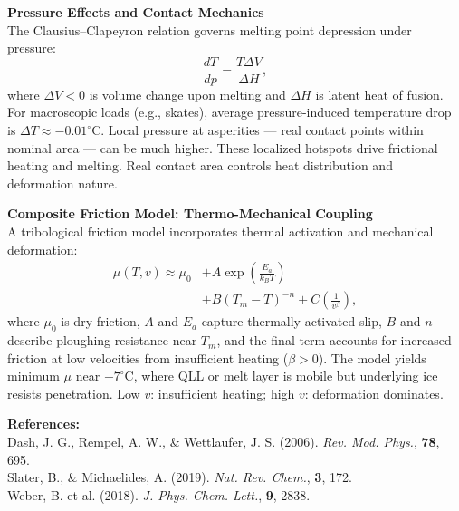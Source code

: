 \begin{technical}
\textbf{Pressure Effects and Contact Mechanics}\\[0.5em]
The Clausius–Clapeyron relation governs melting point depression under pressure:
\[
\frac{dT}{dp} = \frac{T \Delta V}{\Delta H},
\]
where $\Delta V < 0$ is volume change upon melting and $\Delta H$ is latent heat of fusion. For macroscopic loads (e.g., skates), average pressure-induced temperature drop is $\Delta T \approx -0.01^\circ$C. Local pressure at asperities — real contact points within nominal area — can be much higher. These localized hotspots drive frictional heating and melting. Real contact area controls heat distribution and deformation nature.

\textbf{Composite Friction Model: Thermo-Mechanical Coupling}\\[0.5em]
A tribological friction model incorporates thermal activation and mechanical deformation:
\begin{align}
    \mu(T, v) \approx \mu_0 &+ A \exp\left(\frac{E_a}{k_B T}\right) \\&+ B (T_m - T)^{-n} + C \left( \frac{1}{v^\beta} \right),
\end{align}
where $\mu_0$ is dry friction, $A$ and $E_a$ capture thermally activated slip, $B$ and $n$ describe ploughing resistance near $T_m$, and the final term accounts for increased friction at low velocities from insufficient heating ($\beta > 0$). The model yields minimum $\mu$ near $-7^\circ$C, where QLL or melt layer is mobile but underlying ice resists penetration. Low $v$: insufficient heating; high $v$: deformation dominates.

\vspace{0.5em}
\textbf{References:}\\
Dash, J. G., Rempel, A. W., \& Wettlaufer, J. S. (2006). \textit{Rev. Mod. Phys.}, \textbf{78}, 695.\\
Slater, B., \& Michaelides, A. (2019). \textit{Nat. Rev. Chem.}, \textbf{3}, 172.\\
Weber, B. et al. (2018). \textit{J. Phys. Chem. Lett.}, \textbf{9}, 2838.

\end{technical}

